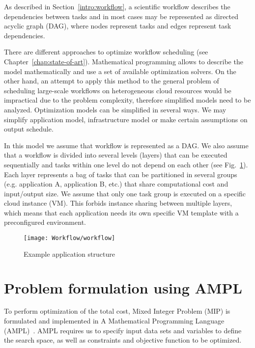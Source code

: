 {    As described in Section \ref{intro:workflow}, a scientific workflow describes the dependencies between tasks and in most cases may be represented as directed acyclic graph (DAG), where nodes represent tasks and edges represent task dependencies. 
    
    There are different approaches to optimize workflow scheduling (see Chapter \ref{chap:state-of-art}). Mathematical programming allows to describe the model mathematically and use a set of available optimization solvers. On the other hand, an attempt to apply this method to the general problem of scheduling large-scale workflows on heterogeneous cloud resources would be impractical due to the problem complexity, therefore simplified models need to be analyzed. Optimization models can be simplified in several ways. We may simplify application model, infrastructure model or make certain assumptions on output schedule.
    
    In this model we assume that workflow is represented as a DAG. We also assume that a workflow is divided into several levels (layers) that can be executed sequentially and tasks within one level do not depend on each other (see Fig.~\ref{fig:workflow:appmodel}). Each layer represents a bag of tasks that can be partitioned in several groups (e.g. application A, application B, etc.) that share computational cost and input/output size. We assume that only one task group is executed on a specific cloud instance (VM). This forbids instance sharing between multiple layers, which means that each application needs its own specific VM template with a preconfigured environment.

    \begin{figure}[tb]
        \centering \texttt{[image: Workflow/workflow]}
        \caption{Example application structure}
        \label{fig:workflow:appmodel}
    \end{figure}
  
    \section{Problem formulation using AMPL}
    \label{sec:workflow:problem}
  
    To perform optimization of the total cost, Mixed Integer Problem (MIP) is formulated and implemented in A Mathematical Programming Language (AMPL)~\cite{Fourer2002}.  AMPL requires us to specify input data sets and variables to define the search space, as well as constraints and objective function to be optimized.
    
}
